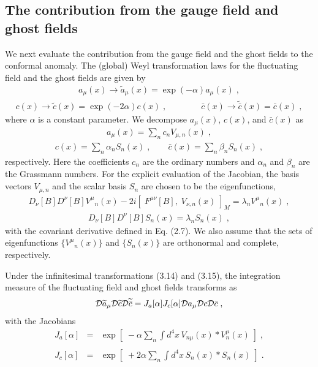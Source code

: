 \documentclass[a4paper,12pt]{article}
\begin{document}
\subsection{The contribution from the gauge field and ghost fields}
%


We next evaluate the contribution from the gauge field and the ghost fields 
to the conformal anomaly. The (global) Weyl transformation laws for the 
fluctuating field and the ghost fields are given by
%
%
\begin{eqnarray}
a_{\mu}(x) \longrightarrow \widetilde{a}_{\mu}(x) 
= \exp\left( -\alpha \right) a_{\mu}(x) \;,
\end{eqnarray}
%
%
\begin{eqnarray}
c(x)  \longrightarrow \widetilde{c}(x) 
=  \exp\left( -2\alpha \right) c(x) \;, \qquad \qquad 
\bar{c}(x) \longrightarrow \widetilde{\bar{c}}(x) 
= \bar{c}(x) \;, 
\end{eqnarray}
%
where $\alpha$ is a constant parameter. We decompose $a_{\mu}(x)$, $c(x)$, and 
$\bar{c}(x)$ as 
%
%
\begin{eqnarray}
a_{\mu}(x) = \sum_{n}c_{n}V_{\mu, n}(x) \;, 
\end{eqnarray}
%
%
\begin{eqnarray}
c(x) = \sum_{n}\alpha_{n}S_{n}(x) \;, \qquad 
\bar{c}(x) = \sum_{n}\beta_{n}S_{n}(x) \;,
\end{eqnarray}
%
respectively. Here the coefficients $c_{n}$ are the ordinary numbers and 
$\alpha_{n}$ and $\beta_{n}$ are the Grassmann numbers. For the explicit 
evaluation of the Jacobian, the basis vectors $V_{\mu, n}$ and the scalar 
basis $S_{n}$ are chosen to be the eigenfunctions, 
%
%
\begin{eqnarray}
D_{\nu}[B]D^{\nu}[B] V^{\mu}{}_{n}(x)    
-2i [\; F^{\mu\nu}[B], \; V_{\nu, n}(x) \;]_{M} 
= \lambda_{n}V^{\mu}{}_{n}(x)  \;, 
\end{eqnarray}
%
%
\begin{eqnarray}
D_{\nu}[B]D^{\nu}[B] S_{n}(x) = \lambda_{n}S_{n}(x) \;, 
\end{eqnarray}
%
with the covariant derivative defined in Eq. (2.7). We also assume that the 
sets of eigenfunctions $\{V^{\mu}{}_{n}(x)\}$ and $\{S_{n}(x)\}$ are 
orthonormal and complete, respectively. 


Under the infinitesimal transformations (3.14) and (3.15), the integration 
measure of the fluctuating field and ghost fields transforms as
%
%
\begin{eqnarray}
{\cal D}\widetilde{a}_{\mu}{\cal D}\widetilde{c} {\cal D}\widetilde{\bar{c}} 
= J_{a}[\alpha] J_{c}[\alpha] {\cal D}a_{\mu} {\cal D}c {\cal D}\bar{c} \;,
\end{eqnarray}
%
with the Jacobians 
%
%
\begin{eqnarray}
J_{a}[\alpha] \!\!&=&\!\! \exp \left[\; -\alpha \sum_{n} \int d^{4}x \, 
V_{n\mu}(x) \ast V_{n}^{\mu}(x)  \; \right]  \;, \\
& & \nonumber \\
J_{c}[\alpha] \!\!&=&\!\! \exp \left[\; +2\alpha \sum_{n} \int d^{4}x \, 
S_{n}(x) \ast S_{n}(x)  \; \right]  \;.
\end{eqnarray}
%
\end{document}
